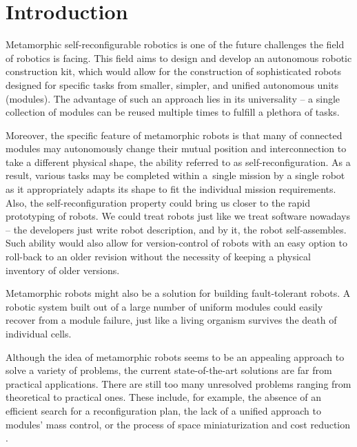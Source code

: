 \chapter{Introduction}\label{chap:introduciton}

Metamorphic self-reconfigurable robotics is one of the future challenges the
field of robotics is facing. This field aims to design and develop an
autonomous robotic construction kit, which would allow for the construction of
sophisticated robots designed for specific tasks from smaller, simpler, and
unified autonomous units (modules). The advantage of such an approach lies in
its universality -- a single collection of modules can be reused multiple times
to fulfill a plethora of tasks.

Moreover, the specific feature of metamorphic robots is that many of connected
modules may autonomously change their mutual position and interconnection to
take a different physical shape, the ability referred to as
self-reconfiguration. As a result, various tasks may be completed within
a~single mission by a single robot as it appropriately adapts its shape to fit
the individual mission requirements. Also, the self-reconfiguration property
could bring us closer to the rapid prototyping of robots. We could treat robots
just like we treat software nowadays -- the developers just write robot
description, and by  it, the robot self-assembles. Such ability
would also allow for version-control of robots with an easy option to roll-back
to an older revision without the necessity of keeping a physical inventory of
older versions.

Metamorphic robots might also be a solution for building fault-tolerant robots.
A robotic system built out of a large number of uniform modules could easily
recover from a module failure, just like a living organism survives the death of
individual cells.

Although the idea of metamorphic robots seems to be an appealing approach to
solve a variety of problems, the current state-of-the-art solutions are far from
practical applications. There are still too many unresolved problems ranging
from theoretical to practical ones. These include, for example, the absence of
an efficient search for a reconfiguration plan, the lack of a unified approach
to modules' mass control, or the process of space miniaturization and cost
reduction \cite{4141032}.

